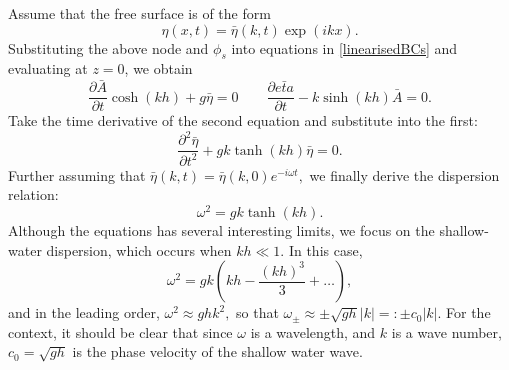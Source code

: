 \documentclass[10pt,reqno,oneside,a4paper]{article}
\begin{document}
Assume that the free surface is of the form
\[ 
\eta(x,t) = \bar{\eta}(k,t) \exp(ikx).
\]
Substituting the above node and $\phi_s$ into equations in \eqref{linearisedBCs} and evaluating at $z=0$, we obtain 
\[
\frac{\partial \bar{A}}{\partial t} \cosh(kh) + g\bar{\eta} = 0 \qquad \frac{\partial \bar{eta}}{\partial t} - k \sinh(kh)\bar{A}  = 0. 
\]
Take the time derivative of the second equation and substitute into the first:
\[ 
\frac{\partial^2 \bar{\eta}}{\partial t^2} +g k \tanh(kh)\bar{\eta} = 0.
\]
Further assuming that $\bar{\eta}(k,t) = \bar{\eta}(k,0)e^{-i \omega t},$ we finally derive the dispersion relation:
\[ 
\omega^2 = gk \tanh(kh).
\]
Although the equations has several interesting limits, we focus on the shallow-water dispersion, which occurs when $kh \ll 1.$ In this case, 
\[ 
\omega^2 = gk (kh - \frac{(kh)^3}{3} + \ldots),
\]
and in the leading order, $\omega^2  \approx ghk^2,$ so that $\omega_{\pm} \approx \pm\sqrt{gh} |k| =: \pm c_0 |k|.$ For the context, it should be clear that since $\omega$ is a wavelength, and $k$ is a wave number, $c_0 = \sqrt{gh}$ is the phase velocity of the shallow water wave.  
\end{document}
